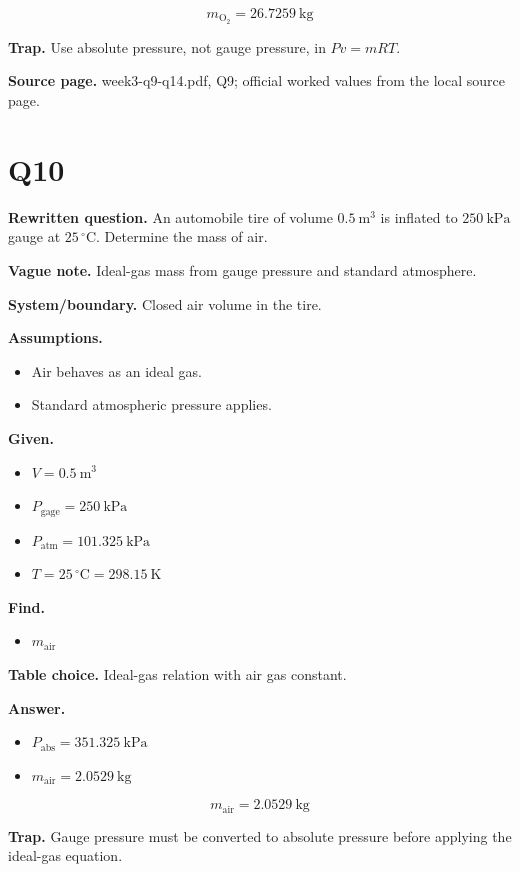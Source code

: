 \[\boxed{m_{\mathrm{O_2}} = 26.7259\ \mathrm{kg}}\]

\textbf{Trap.} Use absolute pressure, not gauge pressure, in $Pv=mRT$.

\textbf{Source page.} week3-q9-q14.pdf, Q9; official worked values from the local source page.

\section*{Q10}
\textbf{Rewritten question.} An automobile tire of volume $0.5\ \mathrm{m^3}$ is inflated to $250\ \mathrm{kPa}$ gauge at $25\,^{\circ}\mathrm{C}$. Determine the mass of air.

\textbf{Vague note.} Ideal-gas mass from gauge pressure and standard atmosphere.

\textbf{System/boundary.} Closed air volume in the tire.

\textbf{Assumptions.}
\begin{itemize}
  \item Air behaves as an ideal gas.
  \item Standard atmospheric pressure applies.
\end{itemize}

\textbf{Given.}
\begin{itemize}
  \item $V = 0.5\ \mathrm{m^3}$
  \item $P_{\mathrm{gage}} = 250\ \mathrm{kPa}$
  \item $P_{\mathrm{atm}} = 101.325\ \mathrm{kPa}$
  \item $T = 25\,^{\circ}\mathrm{C} = 298.15\ \mathrm{K}$
\end{itemize}

\textbf{Find.}
\begin{itemize}
  \item $m_{\mathrm{air}}$
\end{itemize}

\textbf{Table choice.} Ideal-gas relation with air gas constant.

\textbf{Answer.}
\begin{itemize}
  \item $P_{\mathrm{abs}} = 351.325\ \mathrm{kPa}$
  \item $m_{\mathrm{air}} = 2.0529\ \mathrm{kg}$
\end{itemize}

\[\boxed{m_{\mathrm{air}} = 2.0529\ \mathrm{kg}}\]

\textbf{Trap.} Gauge pressure must be converted to absolute pressure before applying the ideal-gas equation.

